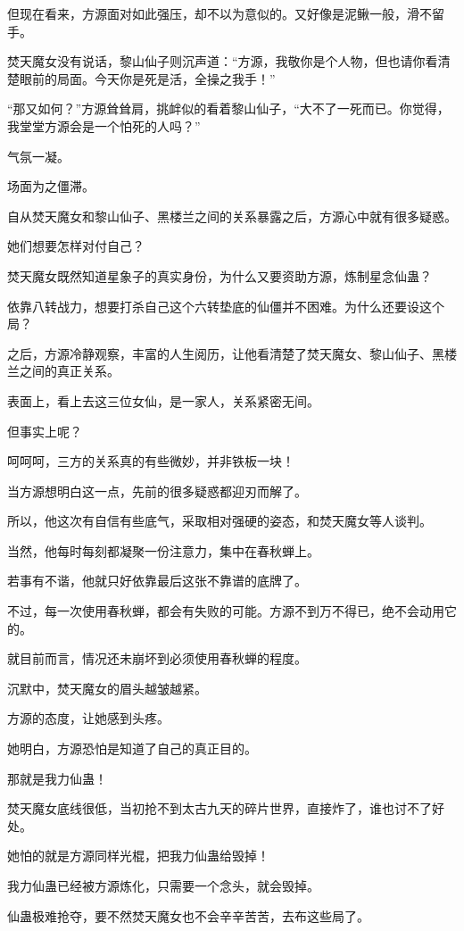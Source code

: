 \begin{this_body}
但现在看来，方源面对如此强压，却不以为意似的。又好像是泥鳅一般，滑不留手。

焚天魔女没有说话，黎山仙子则沉声道：“方源，我敬你是个人物，但也请你看清楚眼前的局面。今天你是死是活，全操之我手！”

“那又如何？”方源耸耸肩，挑衅似的看着黎山仙子，“大不了一死而已。你觉得，我堂堂方源会是一个怕死的人吗？”

气氛一凝。

场面为之僵滞。

自从焚天魔女和黎山仙子、黑楼兰之间的关系暴露之后，方源心中就有很多疑惑。

她们想要怎样对付自己？

焚天魔女既然知道星象子的真实身份，为什么又要资助方源，炼制星念仙蛊？

依靠八转战力，想要打杀自己这个六转垫底的仙僵并不困难。为什么还要设这个局？

之后，方源冷静观察，丰富的人生阅历，让他看清楚了焚天魔女、黎山仙子、黑楼兰之间的真正关系。

表面上，看上去这三位女仙，是一家人，关系紧密无间。

但事实上呢？

呵呵呵，三方的关系真的有些微妙，并非铁板一块！

当方源想明白这一点，先前的很多疑惑都迎刃而解了。

所以，他这次有自信有些底气，采取相对强硬的姿态，和焚天魔女等人谈判。

当然，他每时每刻都凝聚一份注意力，集中在春秋蝉上。

若事有不谐，他就只好依靠最后这张不靠谱的底牌了。

不过，每一次使用春秋蝉，都会有失败的可能。方源不到万不得已，绝不会动用它的。

就目前而言，情况还未崩坏到必须使用春秋蝉的程度。

沉默中，焚天魔女的眉头越皱越紧。

方源的态度，让她感到头疼。

她明白，方源恐怕是知道了自己的真正目的。

那就是我力仙蛊！

焚天魔女底线很低，当初抢不到太古九天的碎片世界，直接炸了，谁也讨不了好处。

她怕的就是方源同样光棍，把我力仙蛊给毁掉！

我力仙蛊已经被方源炼化，只需要一个念头，就会毁掉。

仙蛊极难抢夺，要不然焚天魔女也不会辛辛苦苦，去布这些局了。

\end{this_body}

